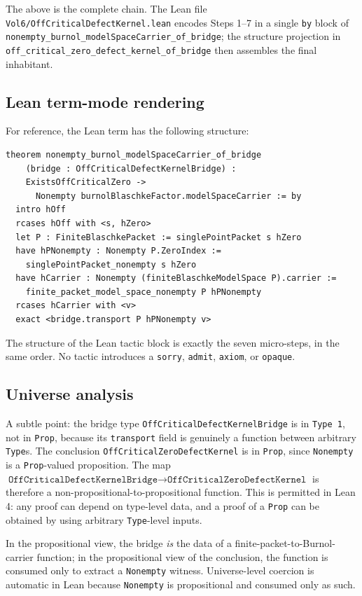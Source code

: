 \documentclass[12pt]{article}
\theoremstyle{definition}
\theoremstyle{remark}
\begin{document}
The above is the complete chain. The Lean file
\texttt{Vol6/OffCriticalDefectKernel.lean} encodes Steps 1--7 in a single
\texttt{by} block of
\texttt{nonempty\_burnol\_modelSpaceCarrier\_of\_bridge}; the structure
projection in
\texttt{off\_critical\_zero\_defect\_kernel\_of\_bridge} then assembles
the final inhabitant.

\subsection{Lean term-mode rendering}

For reference, the Lean term has the following structure:
\begin{verbatim}
theorem nonempty_burnol_modelSpaceCarrier_of_bridge
    (bridge : OffCriticalDefectKernelBridge) :
    ExistsOffCriticalZero ->
      Nonempty burnolBlaschkeFactor.modelSpaceCarrier := by
  intro hOff
  rcases hOff with <s, hZero>
  let P : FiniteBlaschkePacket := singlePointPacket s hZero
  have hPNonempty : Nonempty P.ZeroIndex :=
    singlePointPacket_nonempty s hZero
  have hCarrier : Nonempty (finiteBlaschkeModelSpace P).carrier :=
    finite_packet_model_space_nonempty P hPNonempty
  rcases hCarrier with <v>
  exact <bridge.transport P hPNonempty v>
\end{verbatim}
The structure of the Lean tactic block is exactly the seven micro-steps,
in the same order. No tactic introduces a \texttt{sorry}, \texttt{admit},
\texttt{axiom}, or \texttt{opaque}.

\subsection{Universe analysis}

A subtle point: the bridge type
\texttt{OffCriticalDefectKernelBridge} is in \texttt{Type 1}, not in
\texttt{Prop}, because its \texttt{transport} field is genuinely a
function between arbitrary \texttt{Type}s. The conclusion
\texttt{OffCriticalZeroDefectKernel} is in \texttt{Prop}, since
\texttt{Nonempty} is a \texttt{Prop}-valued proposition. The map
\(
\texttt{OffCriticalDefectKernelBridge}\to
\texttt{OffCriticalZeroDefectKernel}
\)
is therefore a non-propositional-to-propositional function. This is
permitted in Lean 4: any proof can depend on type-level data, and a
proof of a \texttt{Prop} can be obtained by using arbitrary
\texttt{Type}-level inputs.

In the propositional view, the bridge \emph{is} the data of a
finite-packet-to-Burnol-carrier function; in the propositional view of
the conclusion, the function is consumed only to extract a
\texttt{Nonempty} witness. Universe-level coercion is automatic in Lean
because \texttt{Nonempty} is propositional and consumed only as such.
\end{document}
